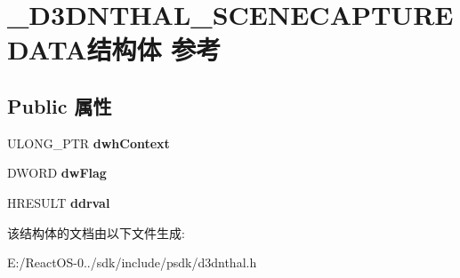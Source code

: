 \hypertarget{struct___d3_d_n_t_h_a_l___s_c_e_n_e_c_a_p_t_u_r_e_d_a_t_a}{}\section{\+\_\+\+D3\+D\+N\+T\+H\+A\+L\+\_\+\+S\+C\+E\+N\+E\+C\+A\+P\+T\+U\+R\+E\+D\+A\+T\+A结构体 参考}
\label{struct___d3_d_n_t_h_a_l___s_c_e_n_e_c_a_p_t_u_r_e_d_a_t_a}
\subsection*{Public 属性}
\begin{DoxyCompactItemize}
\item 
\mbox{\label{struct___d3_d_n_t_h_a_l___s_c_e_n_e_c_a_p_t_u_r_e_d_a_t_a_aae1607655b1645f1c7e1cf39e465a0fd}} 
U\+L\+O\+N\+G\+\_\+\+P\+TR {\bfseries dwh\+Context}
\item 
\mbox{\label{struct___d3_d_n_t_h_a_l___s_c_e_n_e_c_a_p_t_u_r_e_d_a_t_a_a68fb11fce22454a413dd0af542e5a02f}} 
D\+W\+O\+RD {\bfseries dw\+Flag}
\item 
\mbox{\label{struct___d3_d_n_t_h_a_l___s_c_e_n_e_c_a_p_t_u_r_e_d_a_t_a_af05768f340623e93b75bf1197c26a862}} 
H\+R\+E\+S\+U\+LT {\bfseries ddrval}
\end{DoxyCompactItemize}


该结构体的文档由以下文件生成\+:\begin{DoxyCompactItemize}
\item 
E\+:/\+React\+O\+S-\/0../sdk/include/psdk/d3dnthal.\+h\end{DoxyCompactItemize}
